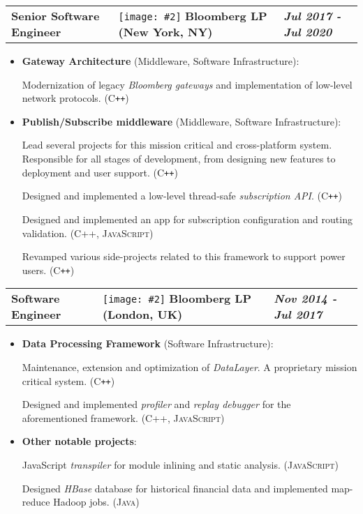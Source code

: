 \documentclass[a4paper,10pt]{article}
\newcommand*{\mahogany}{\textcolor{Mahogany}}
\newcommand{\jobtitle}[5]{
\vspace{0.1cm}
\begin{tabularx}
{\textwidth}
{ >{\raggedright\arraybackslash}p{6cm} 
  >{\raggedright\arraybackslash}X 
  >{\raggedleft\arraybackslash}p{4cm} }
\large\textbf{#1} & 
\texttt{[image: \#2]} \large\textbf{\mahogany{#3}} \normalsize\textbf{(#4)} & 
\textit{\large\textbf{#5}}
\end{tabularx}
\vspace{-0.4cm}
}
\begin{document}
\jobtitle{Senior Software Engineer}{icons/bb.png}{Bloomberg LP}{New York, NY}{Jul 2017 - Jul 2020}
\begin{itemize}[leftmargin=.27in,label=] \setlength\itemsep{-0.1cm}
	\item \textbf{Gateway Architecture} (Middleware, Software Infrastructure):
	\vspace{-0.1cm}
	
	Modernization of legacy \textit{Bloomberg gateways} and implementation of low-level network protocols. \textsc{(C\texttt{++})} 

    \vspace{0.2cm} 
    \item \textbf{Publish/Subscribe middleware} (Middleware, Software Infrastructure):
    \vspace{-0.1cm} 
    
    Lead several projects for this mission critical and cross-platform system. Responsible for all stages of development, from designing new features to deployment and user support.  \textsc{(C\texttt{++})} 
    
    Designed and implemented a low-level thread-safe \textit{subscription API}.  \textsc{(C\texttt{++})} 
    
    Designed and implemented an app for subscription configuration and routing validation. \textsc{(C++, JavaScript)}
    
    Revamped various side-projects related to this framework to support power users.  \textsc{(C\texttt{++})}
\end{itemize}

\jobtitle{Software Engineer}{icons/bb.png}{Bloomberg LP}{London, UK}{Nov 2014 - Jul 2017}
\begin{itemize}[leftmargin=.27in,label=] 
\setlength\itemsep{-0.1cm}
\item \textbf{Data Processing Framework} (Software Infrastructure):
\vspace{-0.1cm}

Maintenance, extension and optimization of \textit{DataLayer}. A proprietary mission critical system. \textsc{(C\texttt{++})}

Designed and implemented \textit{profiler} and \textit{replay debugger} for the aforementioned framework. \textsc{(C++, JavaScript)}


\vspace{0.2cm} 
\item \textbf{Other notable projects}: 
\vspace{-0.1cm}

JavaScript \textit{transpiler} for module inlining and static analysis. \textsc{(JavaScript)}

Designed \textit{HBase} database for historical financial data and implemented map-reduce Hadoop jobs. \textsc{(Java)} 
\end{itemize}
\end{document}
